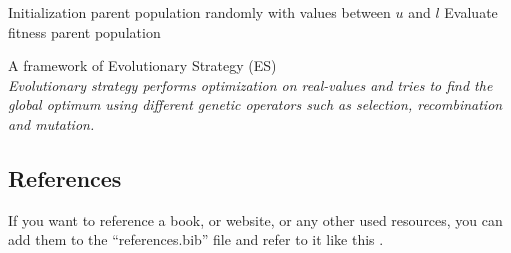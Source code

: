 \documentclass{article}
\begin{document}
\begin{algorithm}[!ht]
\SetAlgoLined
{}

\BlankLine

Initialization parent population randomly with values between $u$ and $l$
Evaluate fitness parent population\;
\

\caption{A framework of Evolutionary Strategy (ES) \\ 
\emph{Evolutionary strategy performs optimization on real-values and tries to find the global optimum using different genetic operators such as selection, recombination and mutation. }}\label{al:LOF}
\end{algorithm}

\subsection*{References}

If you want to reference a book, or website, or any other used resources, you can add them to the ``references.bib'' file and refer to it like this \cite{example}.
\end{document}
